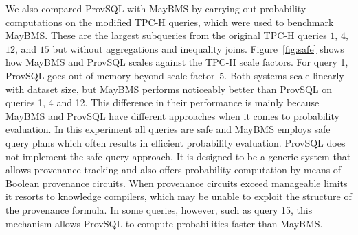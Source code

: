 We also compared ProvSQL with MayBMS by carrying out probability
computations on the modified TPC-H queries, which were used to benchmark
MayBMS. These are the largest subqueries from the original TPC-H queries
$1$, $4$, $12$, and $15$ but without aggregations and inequality joins.
Figure~\ref{fig:safe} shows how MayBMS and ProvSQL scales against the
TPC-H scale factors. For query 1, ProvSQL goes out of memory beyond scale
factor~5. Both systems scale linearly with dataset size, but MayBMS
performs noticeably better than ProvSQL on queries 1, 4 and 12. This
difference in their performance is mainly because MayBMS
and ProvSQL have different approaches when it comes to probability
evaluation. In this experiment all queries are safe and MayBMS employs
safe query plans which often results in efficient probability evaluation.
ProvSQL does not implement the safe query approach. It is designed to be
a generic system that allows provenance tracking and also offers
probability computation by means of Boolean provenance circuits. When
provenance circuits exceed manageable limits it resorts to knowledge
compilers, which may be unable to exploit the structure of the
provenance formula. In some queries, however, such as query 15, this
mechanism allows ProvSQL to compute probabilities faster than
MayBMS.

